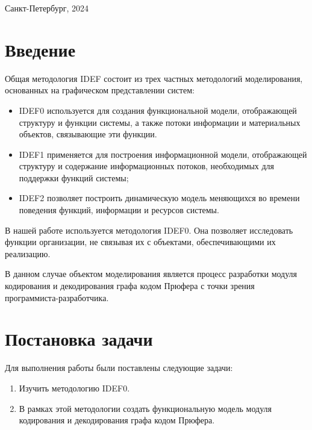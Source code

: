 \documentclass[a4paper, final]{article}
\begin{document}
\hfill \break
\hfill \break
\begin{center} \small{Санкт-Петербург, 2024} \end{center}
\thispagestyle{empty} %

\newpage

\tableofcontents

\newpage

\cleardoublepage
{}
{}
\section*{Введение}
Общая методология IDEF состоит из трех частных
методологий моделирования, основанных на графическом представлении
систем:
\begin{itemize}
  \item IDEF0 используется для создания функциональной модели, отображающей
  структуру и функции системы, а также потоки информации и материальных 
  объектов, связывающие эти функции.
  \item IDEF1 применяется для построения информационной модели, отображающей
  структуру и содержание информационных потоков, необходимых для 
  поддержки функций системы;
  \item IDEF2 позволяет построить динамическую модель меняющихся во времени
  поведения функций, информации и ресурсов системы.
\end{itemize}

В нашей работе используется методология IDEF0. Она позволяет исследовать функции организации, не связывая их с объектами, обеспечивающими их реализацию.

В данном случае объектом моделирования является процесс разработки модуля кодирования и декодирования графа кодом Прюфера с точки зрения программиста-разработчика.

\newpage
\section{Постановка задачи}
\noindent Для выполнения работы были поставлены следующие задачи:
\begin{enumerate}
	\item Изучить методологию IDEF0.
	\item В рамках этой методологии создать функциональную модель модуля кодирования и декодирования графа кодом Прюфера.
\end{enumerate}
\end{document}
